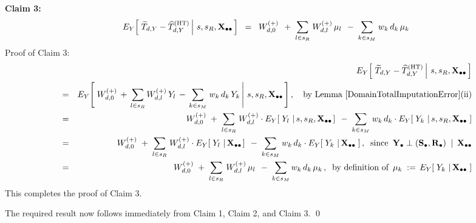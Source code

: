 \begin{enumerate}
    \vskip 0.5cm
    \textbf{Claim 3:}\quad
    \begin{equation*}
    E_{Y}\!\left[\,
        \left.
        \widetilde{T}_{d,Y} - \widehat{T}^{\textnormal{(HT)}}_{d,Y}
        \,\right\vert\,
        s,s_{R},\mathbf{X}_{\bullet\bullet}
        \,\right]
    \;\; = \;\;
        W^{(+)}_{d,0}
        \,\;+\;
        \underset{l \in s_{R}}{\sum}\;W^{(+)}_{d,l}\,\mu_{l}
        \,\;-\;
        \underset{k \in s_{M}}{\sum}\;w_{k}\,d_{k}\,\mu_{k}
    \end{equation*}
    \vskip 0.1cm
    \noindent
    Proof of Claim 3:\;\;
    \begin{eqnarray*}
    &&
        E_{Y}\!\left[\,
            \left.
            \widetilde{T}_{d,Y} - \widehat{T}^{\textnormal{(HT)}}_{d,Y}
            \,\right\vert\,
            s,s_{R},\mathbf{X}_{\bullet\bullet}
            \,\right]
    \\
    & = &
        E_{Y}\!\left[\,
            \left.
            W^{(+)}_{d,0}
            \,+\,
            \underset{l \in s_{R}}{\sum}\,W^{(+)}_{d,l}\,Y_{l}
            \,-\,
            \underset{k \in s_{M}}{\sum}\;w_{k}\,d_{k}\,Y_{k}
            \,\right\vert\,
            s,s_{R},\mathbf{X}_{\bullet\bullet}
            \,\right],
        \quad
        \textnormal{by Lemma \ref{DomainTotalImputationError}(ii)}
    \\
    & = &
        W^{(+)}_{d,0}
        \;+\;
        \underset{l \in s_{R}}{\sum}\;
        W^{(+)}_{d,l}
        \cdot
        E_{Y}\!\left[\;
            Y_{l}
            \,\left\vert\,
            s,s_{R},\mathbf{X}_{\bullet\bullet}
            \right.
            \right]
        \,\;-\;
        \underset{k \in s_{M}}{\sum}\;
        w_{k}\,d_{k}
        \cdot
        E_{Y}\!\left[\;Y_{k}
            \,\left\vert\,
            s,s_{R},\mathbf{X}_{\bullet\bullet}
            \right.
            \,\right]
    \\
    & = &
        W^{(+)}_{d,0}
        \;+\;
        \underset{l \in s_{R}}{\sum}\;
        W^{(+)}_{d,l}
        \cdot
        E_{Y}\!\left[\;
            Y_{l}
            \,\left\vert\,
            \mathbf{X}_{\bullet\bullet}
            \right.
            \right]
        \,\;-\;
        \underset{k \in s_{M}}{\sum}\;
        w_{k}\,d_{k}
        \cdot
        E_{Y}\!\left[\;Y_{k}
            \,\left\vert\,
            \mathbf{X}_{\bullet\bullet}
            \right.
            \,\right],
        \;\;
        \textnormal{since \,$\mathbf{Y}_{\bullet} \perp (\mathbf{S}_{\bullet},\mathbf{R}_{\bullet}) \;\;\vert\;\, \mathbf{X}_{\bullet\bullet}$}
    \\
    & = &
        W^{(+)}_{d,0}
        \;+\;
        \underset{l \in s_{R}}{\sum}\;W^{(+)}_{d,l}\,\mu_{l}
        \,\;-\;
        \underset{k \in s_{M}}{\sum}\,
            w_{k}\,d_{k}\,\mu_{k}\,,
        \;\;
        \textnormal{by definition of
            \,$\mu_{k} \;:=\, E_{Y}\!\left[\;Y_{k}
                \,\left\vert\,
                \mathbf{X}_{\bullet\bullet}
                \right.
                \,\right]$}
    \end{eqnarray*}
    This completes the proof of Claim 3.

    \vskip 0.3cm
    \noindent
    The required result now follows immediately from Claim 1, Claim 2, and Claim 3.
    \qed
\end{enumerate}

